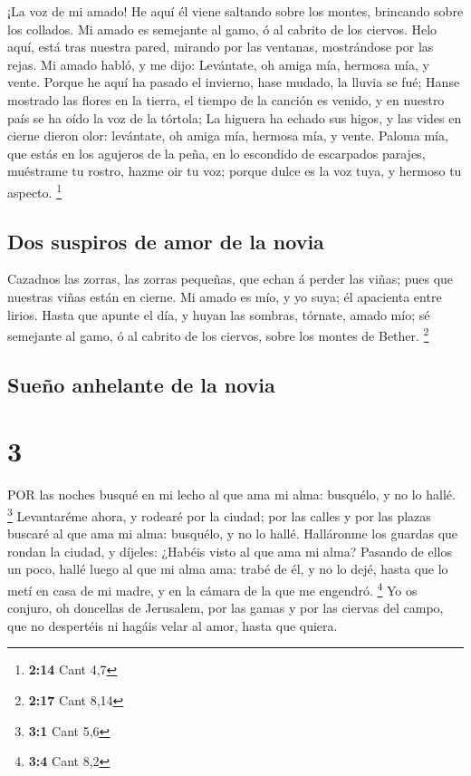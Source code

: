  ¡La voz de mi amado! He aquí él viene saltando sobre los
montes, brincando sobre los collados.  Mi amado es semejante
al gamo, ó al cabrito de los ciervos. Helo aquí, está tras nuestra
pared, mirando por las ventanas, mostrándose por las rejas.
 Mi amado habló, y me dijo: Levántate, oh amiga mía,
hermosa mía, y vente.  Porque he aquí ha pasado el
invierno, hase mudado, la lluvia se fué;  Hanse mostrado
las flores en la tierra, el tiempo de la canción es venido, y en nuestro
país se ha oído la voz de la tórtola;  La higuera ha echado
sus higos, y las vides en cierne dieron olor: levántate, oh amiga mía,
hermosa mía, y vente.  Paloma mía, que estás en los
agujeros de la peña, en lo escondido de escarpados parajes, muéstrame tu
rostro, hazme oir tu voz; porque dulce es la voz tuya, y hermoso tu
aspecto. \footnote{\textbf{2:14} Cant 4,7}

\hypertarget{dos-suspiros-de-amor-de-la-novia}{%
\subsection{Dos suspiros de amor de la
novia}\label{dos-suspiros-de-amor-de-la-novia}}

 Cazadnos las zorras, las zorras pequeñas, que echan á
perder las viñas; pues que nuestras viñas están en cierne. 
Mi amado es mío, y yo suya; él apacienta entre lirios. 
Hasta que apunte el día, y huyan las sombras, tórnate, amado mío; sé
semejante al gamo, ó al cabrito de los ciervos, sobre los montes de
Bether. \footnote{\textbf{2:17} Cant 8,14}

\hypertarget{sueuxf1o-anhelante-de-la-novia}{%
\subsection{Sueño anhelante de la
novia}\label{sueuxf1o-anhelante-de-la-novia}}

\hypertarget{section-2}{%
\section{3}\label{section-2}}

 POR las noches busqué en mi lecho al que ama mi alma:
busquélo, y no lo hallé. \footnote{\textbf{3:1} Cant 5,6} 
Levantaréme ahora, y rodearé por la ciudad; por las calles y por las
plazas buscaré al que ama mi alma: busquélo, y no lo hallé. 
Halláronme los guardas que rondan la ciudad, y díjeles: ¿Habéis visto al
que ama mi alma?  Pasando de ellos un poco, hallé luego al
que mi alma ama: trabé de él, y no lo dejé, hasta que lo metí en casa de
mi madre, y en la cámara de la que me engendró. \footnote{\textbf{3:4}
  Cant 8,2}  Yo os conjuro, oh doncellas de Jerusalem, por
las gamas y por las ciervas del campo, que no despertéis ni hagáis velar
al amor, hasta que quiera.

